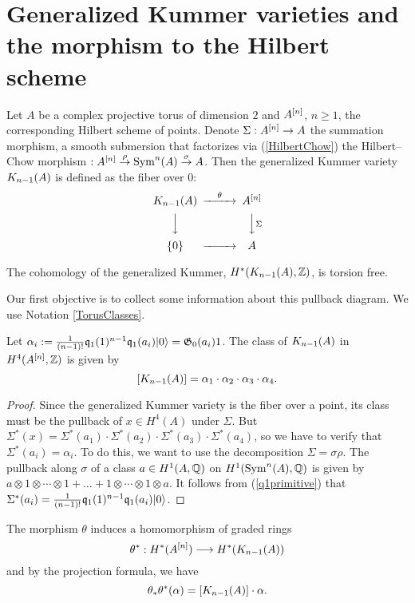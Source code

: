 \section{Generalized Kummer varieties and the morphism to the Hilbert scheme}
\label{Section_GeneralKummer}
\begin{definition}
Let $A$ be a complex projective torus of dimension $2$ and $A\hilb{n}$, $n\geq 1$, the corresponding Hilbert scheme of points. Denote $\Sigma : A\hilb{n} \rightarrow A$ the summation morphism, a smooth submersion that factorizes via (\ref{HilbertChow}) the Hilbert--Chow morphism $: A\hilb{n}\stackrel{\rho}{\rightarrow}\Sym^n(A)\stackrel{\sigma}{\rightarrow} A$. Then the generalized Kummer variety $\kum{A}{n-1}$ is defined as the fiber over $0$:
\begin{equation}\label{square}
\begin{CD}
\kum{A}{n-1} @>\theta >> A\hilb{n}\\
@VVV @VV\Sigma V\\
\{0\} @> >> A
\end{CD}
\end{equation}
\end{definition}
\begin{theorem} \cite[Theorem 2]{Spanier}\label{torsion}
The cohomology of the generalized Kummer, $H^*(\kum{A}{n-1},\Z)$, is torsion free. 
\end{theorem}
Our first objective is to collect some information about this pullback diagram. 
We use Notation \ref{TorusClasses}.

\begin{proposition}\label{KummerClass}
Let $\alpha_i := \frac{1}{(n-1)!}\kq_{1}(1)^{n-1}\kq_1(a_i)\vac = \G_0(a_i)1$. The class of %
$\kum{A}{n-1}$ in $H^4(A\hilb{n},\Z)$ is given by
$$
[\kum{A}{n-1}]=\alpha_1\cdot\alpha_2\cdot\alpha_3\cdot\alpha_4.
$$ 
\end{proposition}
\begin{proof}
Since the generalized Kummer variety is the fiber over a point, its 
class must be the pullback of $x\in H^4(A)$ under $\Sigma$. But $\Sigma^* (x) = \Sigma^*(a_1)\cdot \Sigma^*(a_2)\cdot \Sigma^*(a_3)\cdot \Sigma^*(a_4)$, so we have to verify that $\Sigma^* (a_i) = \alpha_i$. To do this, we want to use the decomposition $\Sigma = \sigma\rho$.
The pullback along $\sigma$ of a class $a\in H^1(A,\Q)$ on $H^1(\Sym^n(A),\Q)$ 
is given by $a\otimes 1\otimes \cdots\otimes 1 + \ldots + 1\otimes \cdots\otimes 1\otimes a$. It follows from (\ref{q1primitive}) that $\Sigma^* (a_i) = \frac{1}{(n-1)!}\kq_{1}(1)^{n-1}\kq_1(a_i)\vac $.
\end{proof}
The morphism $\theta$ induces a homomorphism of graded rings
\begin{equation}
\theta^* :H^*(A\hilb{n})\longrightarrow H^*(\kum{A}{n-1})
\end{equation}
and by the projection formula, we have
\begin{equation}
\theta_*\theta^*(\alpha)  = [\kum{A}{n-1}]\cdot\alpha.
\end{equation}

